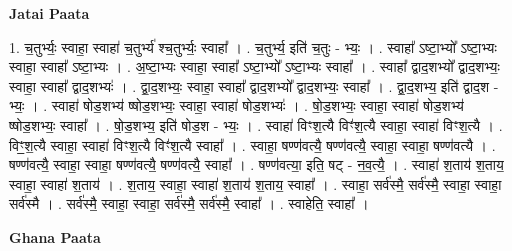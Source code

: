 \documentclass[17pt]{extarticle}
\begin{document}
\textbf{Jatai Paata} \newline

1. च॒तुर्भ्यः॒ स्वाहा॒ स्वाहा॑ च॒तुर्भ्य॑ श्च॒तुर्भ्यः॒ स्वाहा᳚ । . च॒तुर्भ्य॒ इति॑ च॒तुः - भ्यः॒ । . स्वाहा᳚ ऽष्टा॒भ्यो᳚ ऽष्टा॒भ्यः स्वाहा॒ स्वाहा᳚ ऽष्टा॒भ्यः । . अ॒ष्टा॒भ्यः स्वाहा॒ स्वाहा᳚ ऽष्टा॒भ्यो᳚ ऽष्टा॒भ्यः स्वाहा᳚ । . स्वाहा᳚ द्वाद॒शभ्यो᳚ द्वाद॒शभ्यः॒ स्वाहा॒ स्वाहा᳚ द्वाद॒शभ्यः॑ । . द्वा॒द॒शभ्यः॒ स्वाहा॒ स्वाहा᳚ द्वाद॒शभ्यो᳚ द्वाद॒शभ्यः॒ स्वाहा᳚ । . द्वा॒द॒शभ्य॒ इति॑ द्वाद॒श - भ्यः॒ । . स्वाहा॑ षोड॒शभ्य॑ ष्षोड॒शभ्यः॒ स्वाहा॒ स्वाहा॑ षोड॒शभ्यः॑ । . षो॒ड॒शभ्यः॒ स्वाहा॒ स्वाहा॑ षोड॒शभ्य॑ ष्षोड॒शभ्यः॒ स्वाहा᳚ । . षो॒ड॒शभ्य॒ इति॑ षोड॒श - भ्यः॒ । . स्वाहा॑ विꣳश॒त्यै विꣳ॑श॒त्यै स्वाहा॒ स्वाहा॑ विꣳश॒त्यै । . विꣳ॒॒श॒त्यै स्वाहा॒ स्वाहा॑ विꣳश॒त्यै विꣳ॑श॒त्यै स्वाहा᳚ । . स्वाहा॒ षण्ण॑वत्यै॒ षण्ण॑वत्यै॒ स्वाहा॒ स्वाहा॒ षण्ण॑वत्यै । . षण्ण॑वत्यै॒ स्वाहा॒ स्वाहा॒ षण्ण॑वत्यै॒ षण्ण॑वत्यै॒ स्वाहा᳚ । . षण्ण॑वत्या॒ इति॒ षट् - न॒व॒त्यै॒ । . स्वाहा॑ श॒ताय॑ श॒ताय॒ स्वाहा॒ स्वाहा॑ श॒ताय॑ । . श॒ताय॒ स्वाहा॒ स्वाहा॑ श॒ताय॑ श॒ताय॒ स्वाहा᳚ । . स्वाहा॒ सर्व॑स्मै॒ सर्व॑स्मै॒ स्वाहा॒ स्वाहा॒ सर्व॑स्मै । . सर्व॑स्मै॒ स्वाहा॒ स्वाहा॒ सर्व॑स्मै॒ सर्व॑स्मै॒ स्वाहा᳚ । . स्वाहेति॒ स्वाहा᳚ । \newline

\textbf{Ghana Paata } \newline
\end{document}
